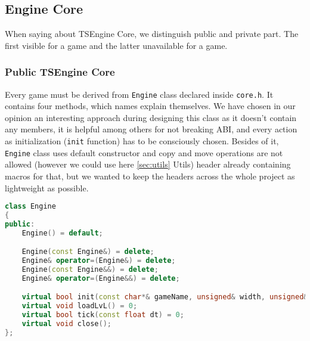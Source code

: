 \newpage
\subsection{Engine Core}
\label{sec:engine_core}
\hspace{\parindent} When saying about TSEngine Core, we distinguish public and private part. The first visible for a game and the latter unavailable for a game.
\subsubsection{Public TSEngine Core}
\label{sec:engine_class}
\hspace{\parindent} Every game must be derived from \texttt{Engine} class declared inside \texttt{core.h}. It contains four methods, which names explain themselves. We have chosen in our opinion an interesting approach during designing this class as it doesn't contain any members, it is helpful among others for not breaking ABI, and every action as initialization (\texttt{init} function) has to be consciously chosen. Besides of it, \texttt{Engine} class uses default constructor and copy and move operations are not allowed (however we could use here \hyperref[sec:utils]{\ref*{sec:utils}} Utils) header already containing macros for that, but we wanted to keep the headers across the whole project as lightweight as possible.\\
\begin{lstlisting}[language=c++, caption=Engine class (./engine/include/tsengine/core.h)]
class Engine
{
public:
    Engine() = default;

    Engine(const Engine&) = delete;
    Engine& operator=(Engine&) = delete;
    Engine(const Engine&&) = delete;
    Engine& operator=(Engine&&) = delete;

    virtual bool init(const char*& gameName, unsigned& width, unsigned& height);
    virtual void loadLvL() = 0;
    virtual bool tick(const float dt) = 0;
    virtual void close();
};
\end{lstlisting}


